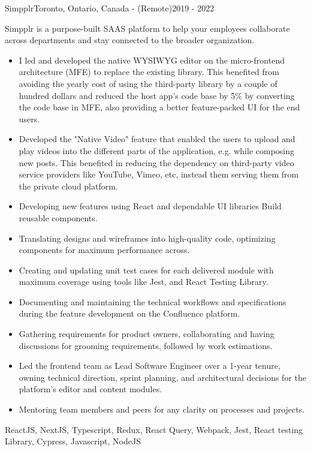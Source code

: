 \begin{projects}
    \newpage
    \project
    {Simpplr}{Toronto, Ontario, Canada - (Remote)}{2019 - 2022}
    {}
    {Simpplr is a purpose-built SAAS platform to help your employees collaborate across departments and stay connected to the broader organization.
    \begin{itemize}
        \item I led and developed the native WYSIWYG editor on the micro-frontend architecture (MFE) to replace the existing library. This benefited from avoiding the yearly cost of using the third-party library by a couple of hundred dollars and reduced the host app's code base by 5\% by converting the code base in MFE, also providing a better feature-packed UI for the end users.
        \item Developed the "Native Video" feature that enabled the users to upload and play videos into the different parts of the application, e.g. while composing new posts. This benefited in reducing the dependency on third-party video service providers like YouTube, Vimeo, etc, instead them serving them from the private cloud platform.
        \item Developing new features using React and dependable UI libraries Build reusable components.
        \item Translating designs and wireframes into high-quality code, optimizing components for maximum performance across.
        \item Creating and updating unit test cases for each delivered module with maximum coverage using tools like Jest, and React Testing Library.
        \item Documenting and maintaining the technical workflows and specifications during the feature development on the Confluence platform.
        \item Gathering requirements for product owners, collaborating and having discussions for grooming requirements, followed by work estimations.
        \item Led the frontend team as Lead Software Engineer over a 1-year tenure, owning technical direction, sprint planning, and architectural decisions for the platform's editor and content modules.
        \item Mentoring team members and peers for any clarity on processes and projects.
    \end{itemize}}
    {ReactJS, NextJS, Typescript, Redux, React Query, Webpack, Jest, React testing Library, Cypress, Javascript, NodeJS}


\end{projects}
